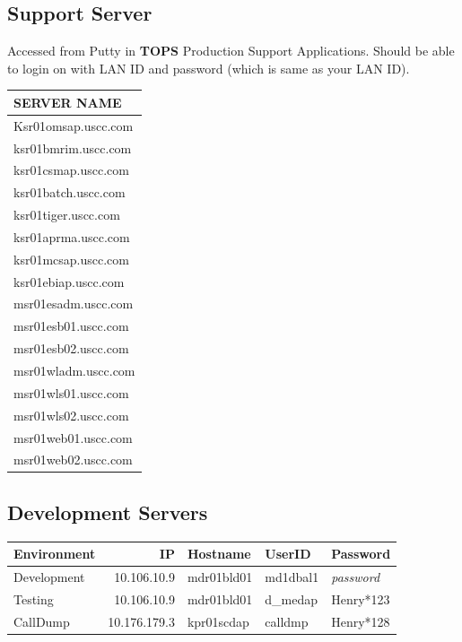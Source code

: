 \documentclass[12pt,twoside]{article}
\begin{document}
\normalsize
\subsection{Support Server}
\label{sec-10-2}

   Accessed from Putty in \textbf{TOPS} Production Support Applications.
   Should be able to login on with LAN ID and password (which is same as your LAN ID).

\begin{center}
\begin{tabular}{l}
\hline
 \textbf{SERVER NAME}  \\
\hline
 Ksr01omsap.uscc.com   \\
 ksr01bmrim.uscc.com   \\
 ksr01csmap.uscc.com   \\
 ksr01batch.uscc.com   \\
 ksr01tiger.uscc.com   \\
 ksr01aprma.uscc.com   \\
 ksr01mcsap.uscc.com   \\
 ksr01ebiap.uscc.com   \\
 msr01esadm.uscc.com   \\
 msr01esb01.uscc.com   \\
 msr01esb02.uscc.com   \\
 msr01wladm.uscc.com   \\
 msr01wls01.uscc.com   \\
 msr01wls02.uscc.com   \\
 msr01web01.uscc.com   \\
 msr01web02.uscc.com   \\
\hline
\end{tabular}
\end{center}
\subsection{Development Servers}
\label{sec-10-3}

\footnotesize

\begin{center}
\begin{tabular}{lrlll}
\hline
 \textbf{Environment}  &   \textbf{IP}  &  \textbf{Hostname}  &  \textbf{UserID}  &  \textbf{Password}  \\
\hline
 Development           &   10.106.10.9  &  mdr01bld01         &  md1dbal1         &  \emph{password}    \\
 Testing               &   10.106.10.9  &  mdr01bld01         &  d\_medap         &  Henry*123          \\
 CallDump              &  10.176.179.3  &  kpr01scdap         &  calldmp          &  Henry*128          \\
\hline
\end{tabular}
\end{center}
\end{document}
